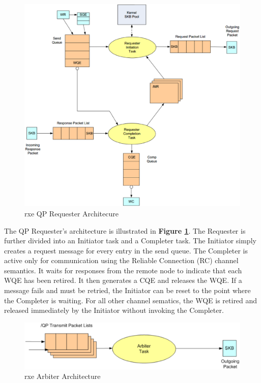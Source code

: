 \documentclass[11pt]{book}
\begin{document}
\begin{figure}[h]
\includegraphics[width=\textwidth]{rxe_req}
\caption{rxe QP Requester Architecure \protect\cite{pearson-10}}
\label{rxe-req}
\end{figure}

The QP Requester's architecture is illustrated in \textbf{Figure
  \ref{rxe-req}}. The Requester is further divided into an Initiator task and a
Completer task. The Initiator simply creates a request message for every entry
in the send queue. The Completer is active only for communication using the
Reliable Connection (RC) channel semantics. It waits for responses from the
remote node to indicate that each WQE has been retired\cite {pearson-10}. It
then generates a CQE and releases the WQE. If a message fails and must be
retried, the Initiator can be reset to the point where the Completer is
waiting. For all other channel sematics, the WQE is retired and released
immediately by the Initiator without invoking the Completer.

\begin{figure}[h]
\includegraphics[width=\textwidth]{rxe_arbiter}
\caption{rxe Arbiter Architecture \protect\cite{pearson-10}}
\label{rxe-arbiter}
\end{figure}
\end{document}

